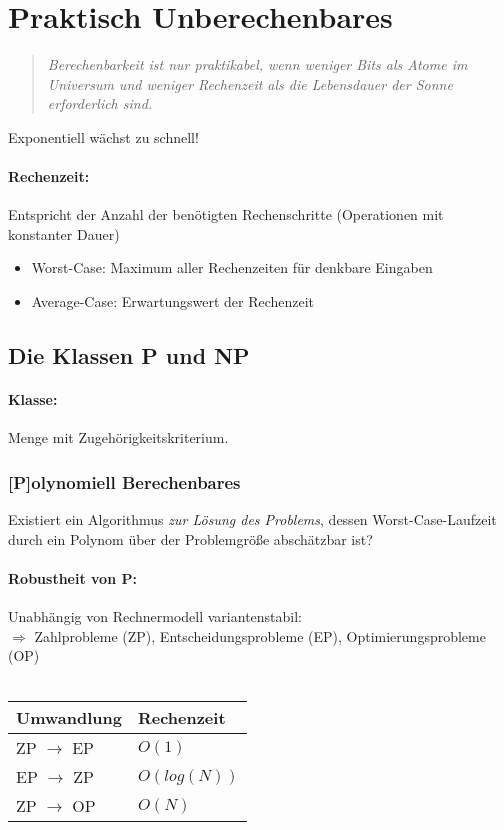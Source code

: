 \documentclass{article}
\begin{document}
\section{Praktisch Unberechenbares}
\begin{quote}
    \emph{
        Berechenbarkeit ist nur praktikabel, wenn weniger Bits als Atome im Universum und weniger Rechenzeit als die Lebensdauer der Sonne erforderlich sind.
    }
\end{quote}
\Rightarrow Exponentiell w\"achst zu schnell!
\paragraph*{Rechenzeit:}
Entspricht der Anzahl der benötigten Rechenschritte (Operationen mit konstanter Dauer)
\begin{itemize}
    \item Worst-Case: Maximum aller Rechenzeiten für denkbare Eingaben
    \item Average-Case: Erwartungswert der Rechenzeit
\end{itemize}


\subsection{Die Klassen P und NP}
\paragraph*{Klasse:}
Menge mit Zugehörigkeitskriterium.
\subsubsection{[P]olynomiell Berechenbares}
Existiert ein Algorithmus \emph{zur Lösung des Problems}, dessen Worst-Case-Laufzeit durch ein Polynom über der Problemgröße abschätzbar ist?
\paragraph*{Robustheit von P:}
Unabhängig von Rechnermodell variantenstabil:\\
$\Rightarrow$ Zahlprobleme (ZP), Entscheidungsprobleme (EP), Optimierungsprobleme (OP)\\\\
\begin{tabular}{l | l}
    Umwandlung          & Rechenzeit  \\ \hline
    ZP $\rightarrow$ EP & $O(1)$      \\
    EP $\rightarrow$ ZP & $O(log(N))$ \\
    ZP $\rightarrow$ OP & $O(N)$
\end{tabular}
\end{document}
